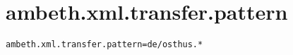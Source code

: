 \section{ambeth.xml.transfer.pattern}
\label{configuration:AmbethXmlTransferPattern}
\AvailableInJavaAndCsharp{\TODO}
\begin{lstlisting}[style=Props,caption={Usage example for \textit{ambeth.xml.transfer.pattern}}]
ambeth.xml.transfer.pattern=de/osthus.*
\end{lstlisting}